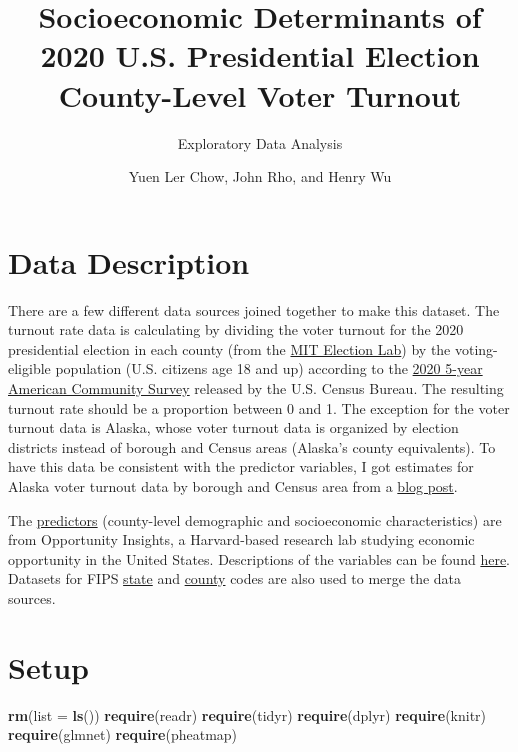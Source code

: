 \documentclass[
]{article}
\title{Socioeconomic Determinants of 2020 U.S. Presidential Election
County-Level Voter Turnout}
\subtitle{Exploratory Data Analysis}
\author{Yuen Ler Chow, John Rho, and Henry Wu}
\date{}
\newenvironment{Shaded}{\begin{snugshade}}{\end{snugshade}}
\newcommand{\AttributeTok}[1]{\textcolor[rgb]{0.13,0.29,0.53}{#1}}
\newcommand{\FunctionTok}[1]{\textcolor[rgb]{0.13,0.29,0.53}{\textbf{#1}}}
\newcommand{\NormalTok}[1]{#1}
\begin{document}
\maketitle

\section{Data Description}\label{data-description}

There are a few different data sources joined together to make this
dataset. The turnout rate data is calculating by dividing the voter
turnout for the 2020 presidential election in each county (from the
\href{https://doi.org/10.7910/DVN/VOQCHQ}{MIT Election Lab}) by the
voting-eligible population (U.S. citizens age 18 and up) according to
the
\href{https://data.census.gov/table/ACSDT5Y2020.B05003?t=Citizenship&g=010XX00US$0500000&y=2020&d=ACS\%205-Year\%20Estimates\%20Detailed\%20Tables&moe=false&tp=true}{2020
5-year American Community Survey} released by the U.S. Census Bureau.
The resulting turnout rate should be a proportion between 0 and 1. The
exception for the voter turnout data is Alaska, whose voter turnout data
is organized by election districts instead of borough and Census areas
(Alaska's county equivalents). To have this data be consistent with the
predictor variables, I got estimates for Alaska voter turnout data by
borough and Census area from a
\href{https://rrhelections.com/index.php/2021/04/13/alaska-presidential-results-by-county-equivalent-1960-2020/9/}{blog
post}.

The
\href{https://opportunityinsights.org/wp-content/uploads/2024/07/Table_8_county_covariates.csv}{predictors}
(county-level demographic and socioeconomic characteristics) are from
Opportunity Insights, a Harvard-based research lab studying economic
opportunity in the United States. Descriptions of the variables can be
found
\href{https://opportunityinsights.org/wp-content/uploads/2019/07/Codebook-for-Table-10.pdf}{here}.
Datasets for FIPS
\href{https://www2.census.gov/geo/docs/reference/codes2020/national_state2020.txt}{state}
and
\href{https://www2.census.gov/geo/docs/reference/codes2020/national_county2020.txt}{county}
codes are also used to merge the data sources.

\section{Setup}\label{setup}

\begin{Shaded}
\begin{Highlighting}[]
\FunctionTok{rm}\NormalTok{(}\AttributeTok{list =} \FunctionTok{ls}\NormalTok{())}
\FunctionTok{require}\NormalTok{(readr)}
\FunctionTok{require}\NormalTok{(tidyr)}
\FunctionTok{require}\NormalTok{(dplyr)}
\FunctionTok{require}\NormalTok{(knitr)}
\FunctionTok{require}\NormalTok{(glmnet)}
\FunctionTok{require}\NormalTok{(pheatmap)}
\end{Highlighting}
\end{Shaded}
\end{document}
